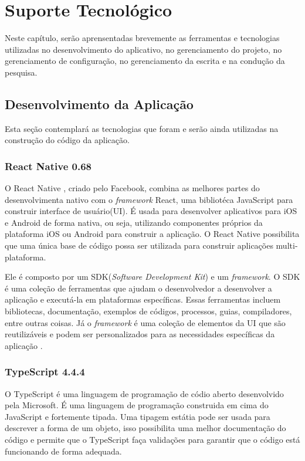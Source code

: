 \chapter[Suporte Tecnológico]{Suporte Tecnológico}
\label{ch:suporte}

Neste capítulo, serão aprensentadas brevemente as ferramentas e tecnologias 
utilizadas no desenvolvimento do aplicativo, no gerenciamento 
do projeto, no gerenciamento de configuração, no gerenciamento da 
escrita e na condução da pesquisa.


\section{Desenvolvimento da Aplicação}

Esta seção contemplará as tecnologias que foram e serão ainda utilizadas na construção do 
código da aplicação.

\subsection{React Native 0.68}

O React Native \cite{reactNative}, criado pelo Facebook, combina as melhores partes do 
desenvolvimenta nativo com 
o \emph{framework} React, uma bibliotéca JavaScript para construir interface de usuário(UI). 
É usada para desenvolver aplicativos para iOS e Android de forma nativa, ou seja, utilizando 
componentes próprios da plataforma iOS ou Android para construir a aplicação. O React Native 
possibilita que uma única base de código possa ser utilizada para construir aplicações 
multi-plataforma.

Ele é composto por um SDK(\emph{Software Development Kit}) e um
\emph{framework}. O SDK é uma coleção de ferramentas que ajudam
o desenvolvedor a desenvolver a aplicação e executá-la em
plataformas específicas. Essas ferramentas incluem bibliotecas,
documentação, exemplos de códigos, processos, guias,
compiladores, entre outras coisas. Já o \emph{framework} é
uma coleção de elementos da UI que são reutilizáveis e podem
ser personalizados para as necessidades específicas da
aplicação \cite{reactNative}.

\subsection{TypeScript 4.4.4}

O TypeScript \cite{typescript} é uma linguagem de programação de códio aberto 
desenvolvido pela Microsoft. É uma linguagem de programação construida em cima do JavaScript e 
fortemente tipada. Uma tipagem estátia pode ser usada para descrever a forma de um objeto, isso possibilita 
uma melhor documentação do código e permite que o TypeScript faça validações para garantir que o código 
está funcionando de forma adequada.


